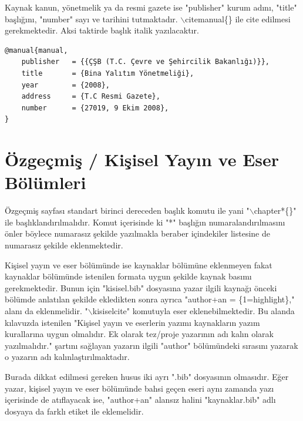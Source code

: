Kaynak kanun, yönetmelik ya da resmi gazete ise "publisher" kurum adını, "title" başlığını, "number" sayı ve tarihini tutmaktadır. $\backslash$citemanual\{\} ile cite edilmesi gerekmektedir. Aksi taktirde başlık italik yazılacaktır.

\begin{lstlisting}[language={[LaTeX]{TeX}}, label=bib:kanun, caption={Kaynak kanun, yönetmelik ya da resmi gazete ise}]
@manual{manual,
	publisher   = {{ÇŞB (T.C. Çevre ve Şehircilik Bakanlığı)}},
	title 		= {Bina Yalıtım Yönetmeliği},
	year		= {2008},
	address		= {T.C Resmi Gazete},
	number		= {27019, 9 Ekim 2008},	
}
\end{lstlisting}


\chapter{Özgeçmiş / Kişisel Yayın ve Eser Bölümleri }
\label{ch:ozgec}
Özgeçmiş sayfası standart birinci dereceden başlık komutu ile yani "$\backslash$chapter*\{\}" ile başlıklandırılmalıdır. Komut içerisinde ki "*" başlığın numaralandırılmasını önler böylece numarasız şekilde yazılmakla beraber içindekiler listesine de numarasız şekilde eklenmektedir.

Kişisel yayın ve eser bölümünde ise kaynaklar bölümüne eklenmeyen fakat kaynaklar bölümünde istenilen formata uygun şekilde kaynak basımı gerekmektedir. Bunun için "kisisel.bib" dosyasına yazar ilgili kaynağı önceki bölümde anlatılan şekilde ekledikten sonra ayrıca "author+an = \{1=highlight\}," alanı da eklenmelidir. "$\backslash$kisiselcite{}" komutuyla eser eklenebilmektedir. Bu alanda kılavuzda istenilen "Kişisel yayın ve eserlerin yazımı kaynakların yazım kurallarına uygun olmalıdır. Ek olarak tez/proje yazarının adı kalın olarak yazılmalıdır." şartını sağlayan yazarın ilgili "author" bölümündeki sırasını yazarak o yazarın adı kalınlaştırılmaktadır.

Burada dikkat edilmesi gereken husus iki ayrı ".bib" dosyasının olmasıdır. Eğer yazar, kişisel yayın ve eser bölümünde bahsi geçen eseri aynı zamanda yazı içerisinde de atıflayacak ise, "author+an" alansız halini "kaynaklar.bib" adlı dosyaya da farklı etiket ile eklemelidir.


